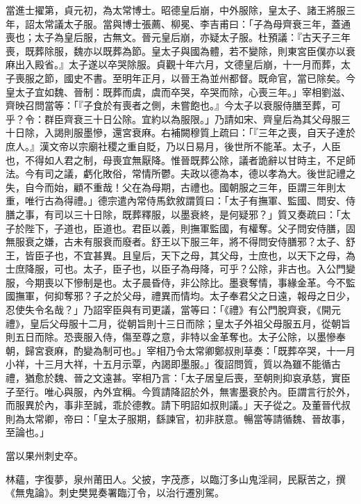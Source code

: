 \begin{pinyinscope}
 當進士擢第，貞元初，為太常博士。昭德皇后崩，中外服除，皇太子、諸王將服三年，詔太常議太子服。當與博士張薦、柳冕、李吉甫曰：「子為母齊衰三年，蓋通喪也；太子為皇后服，古無文。晉元皇后崩，亦疑太子服。杜預議：『古天子三年喪，既葬除服，魏亦以既葬為節。皇太子與國為體，若不變除，則東宮臣僕亦以衰麻出入殿省。』太子遂以卒哭除服。貞觀十年六月，文德皇后崩，十一月而葬，太子喪服之節，國史不書。至明年正月，以晉王為並州都督。既命官，當已除矣。今皇太子宜如魏、晉制：既葬而虞，虞而卒哭，卒哭而除，心喪三年。」宰相劉滋、齊映召問當等：「『子食於有喪者之側，未嘗飽也。』今太子以衰服侍膳至葬，可乎？令：群臣齊衰三十日公除。宜約以為服限。」乃請如宋、齊皇后為其父母服三十日除，入謁則服墨慘，還宮衰麻。右補闕穆質上疏曰：「『三年之喪，自天子達於庶人。』漢文帝以宗廟社稷之重自貶，乃以日易月，後世所不能革。太子，人臣也，不得如人君之制，母喪宜無厭降。惟晉既葬公除，議者詭辭以甘時主，不足師法。今有司之議，虧化敗俗，常情所鬱。夫政以德為本，德以孝為大。後世記禮之失，自今而始，顧不重哉！父在為母期，古禮也。國朝服之三年，臣謂三年則太重，唯行古為得禮。」德宗遣內常侍馬欽敘謂質曰：「太子有撫軍、監國、問安、侍膳之事，有司以三十日除，既葬釋服，以墨衰終，是何疑邪？」質又奏疏曰：「太子於陛下，子道也，臣道也。君臣以義，則撫軍監國，有權奪。父子問安侍膳，固無服衰之嫌，古未有服衰而廢者。舒王以下服三年，將不得問安侍膳邪？太子、舒王，皆臣子也，不宜甚異。且皇后，天下之母，其父母，士庶也，以天下之母，為士庶降服，可也。太子，臣子也，以臣子為母降，可乎？公除，非古也。入公門變服，今期喪以下慘制是也。太子晨昏侍，非公除比。墨衰奪情，事緣金革。今不監國撫軍，何抑奪邪？子之於父母，禮異而情均。太子奉君父之日遠，報母之日少，忍使失令名哉？」乃詔宰臣與有司更議，當等曰：「《禮》有公門脫齊衰，《開元禮》，皇后父母服十二月，從朝旨則十三日而除；皇太子外祖父母服五月，從朝旨則五日而除。恐喪服入侍，傷至尊之意，非特以金革奪也。太子公除，以墨慘奉朝，歸宮衰麻，酌變為制可也。」宰相乃令太常卿鄭叔則草奏：「既葬卒哭，十一月小祥，十三月大祥，十五月示覃，內謁即墨服。」復詔問質，質以為雖不能循古禮，猶愈於魏、晉之文遠甚。宰相乃言：「太子居皇后喪，至朝則抑哀承慈，實臣子至行。唯心與服，內外宜稱。今質請降詔於外，無害墨衰於內。臣謂言行於外，而服異於內，事非至誠，乖於德教。請下明詔如叔則議。」天子從之。及董晉代叔則為太常卿，帝曰：「皇太子服期，繇諫官，初非朕意。暢當等請循魏、晉故事，至論也。」



 當以果州刺史卒。



 林蘊，字復夢，泉州莆田人。父披，字茂彥，以臨汀多山鬼淫祠，民厭苦之，撰《無鬼論》。刺史樊晃奏署臨汀令，以治行遷別駕。




\end{pinyinscope}
